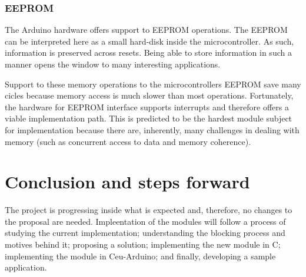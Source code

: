 \documentclass{article}
\begin{document}
\subsubsection{EEPROM}
\tab The Arduino hardware offers support to EEPROM operations. The EEPROM can be interpreted here as a small hard-disk inside the microcontroller. As such, information is preserved across resets. Being able to store information in such a manner opens the window to many interesting applications. 
\par Support to these memory operations to the microcontrollers EEPROM save many cicles because memory access is much slower than most operations. Fortunately, the hardware for EEPROM interface supports interrupts and therefore offers a viable implementation path. This is predicted to be the hardest module subject for implementation because there are, inherently, many challenges in dealing with memory (such as concurrent access to data and memory coherence).

\section{Conclusion and steps forward}
\tab The project is progressing inside what is expected and, therefore, no changes to the proposal are needed. Impleentation of the modules will follow a process of studying the current implementation; understanding the blocking process and motives behind it; proposing a solution; implementing the new module in C; implementing the module in Ceu-Arduino; and finally, developing a sample application.
\end{document}
